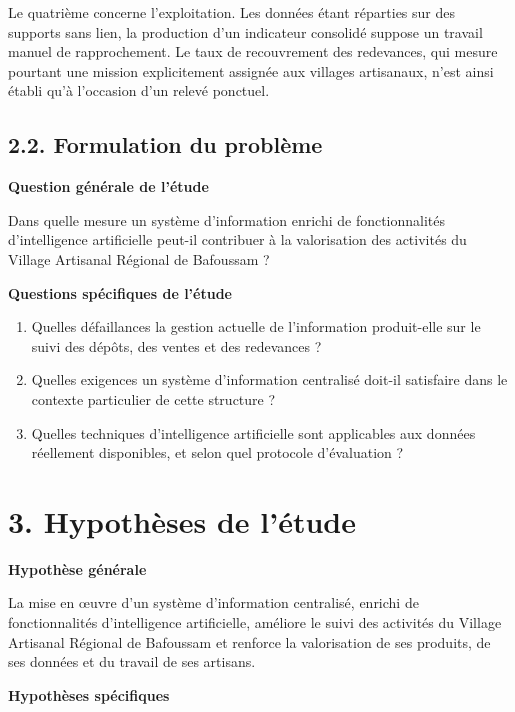 Le quatrième concerne l'exploitation. Les données étant réparties sur des supports sans lien, la production d'un indicateur consolidé suppose un travail manuel de rapprochement. Le taux de recouvrement des redevances, qui mesure pourtant une mission explicitement assignée aux villages artisanaux, n'est ainsi établi qu'à l'occasion d'un relevé ponctuel.

\subsection*{2.2. Formulation du problème}

\noindent\textbf{Question générale de l'étude}

Dans quelle mesure un système d'information enrichi de fonctionnalités d'intelligence artificielle peut-il contribuer à la valorisation des activités du Village Artisanal Régional de Bafoussam ?

\noindent\textbf{Questions spécifiques de l'étude}

\begin{enumerate}[label=\alph*),leftmargin=1.6em,itemsep=0.3em]
\item Quelles défaillances la gestion actuelle de l'information produit-elle sur le suivi des dépôts, des ventes et des redevances ?
\item Quelles exigences un système d'information centralisé doit-il satisfaire dans le contexte particulier de cette structure ?
\item Quelles techniques d'intelligence artificielle sont applicables aux données réellement disponibles, et selon quel protocole d'évaluation ?
\end{enumerate}

\section*{3. Hypothèses de l'étude}

\noindent\textbf{Hypothèse générale}

La mise en œuvre d'un système d'information centralisé, enrichi de fonctionnalités d'intelligence artificielle, améliore le suivi des activités du Village Artisanal Régional de Bafoussam et renforce la valorisation de ses produits, de ses données et du travail de ses artisans.

\noindent\textbf{Hypothèses spécifiques}

